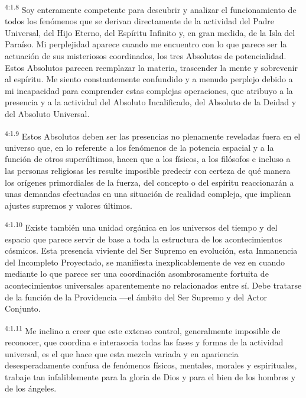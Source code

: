 \par
\textsuperscript{4:1.8} Soy enteramente competente para descubrir y analizar el funcionamiento de todos los fenómenos que se derivan directamente de la actividad del Padre Universal, del Hijo Eterno, del Espíritu Infinito y, en gran medida, de la Isla del Paraíso. Mi perplejidad aparece cuando me encuentro con lo que parece ser la actuación de sus misteriosos coordinados, los tres Absolutos de potencialidad. Estos Absolutos parecen reemplazar la materia, trascender la mente y sobrevenir al espíritu. Me siento constantemente confundido y a menudo perplejo debido a mi incapacidad para comprender estas complejas operaciones, que atribuyo a la presencia y a la actividad del Absoluto Incalificado, del Absoluto de la Deidad y del Absoluto Universal.

\par
\textsuperscript{4:1.9} Estos Absolutos deben ser las presencias no plenamente reveladas fuera en el universo que, en lo referente a los fenómenos de la potencia espacial y a la función de otros superúltimos, hacen que a los físicos, a los filósofos e incluso a las personas religiosas les resulte imposible predecir con certeza de qué manera los orígenes primordiales de la fuerza, del concepto o del espíritu reaccionarán a unas demandas efectuadas en una situación de realidad compleja, que implican ajustes supremos y valores últimos.

\par
\textsuperscript{4:1.10} Existe también una unidad orgánica en los universos del tiempo y del espacio que parece servir de base a toda la estructura de los acontecimientos cósmicos. Esta presencia viviente del Ser Supremo en evolución, esta Inmanencia del Incompleto Proyectado, se manifiesta inexplicablemente de vez en cuando mediante lo que parece ser una coordinación asombrosamente fortuita de acontecimientos universales aparentemente no relacionados entre sí. Debe tratarse de la función de la Providencia ---el ámbito del Ser Supremo y del Actor Conjunto.

\par
\textsuperscript{4:1.11} Me inclino a creer que este extenso control, generalmente imposible de reconocer, que coordina e interasocia todas las fases y formas de la actividad universal, es el que hace que esta mezcla variada y en apariencia desesperadamente confusa de fenómenos físicos, mentales, morales y espirituales, trabaje tan infaliblemente para la gloria de Dios y para el bien de los hombres y de los ángeles.

